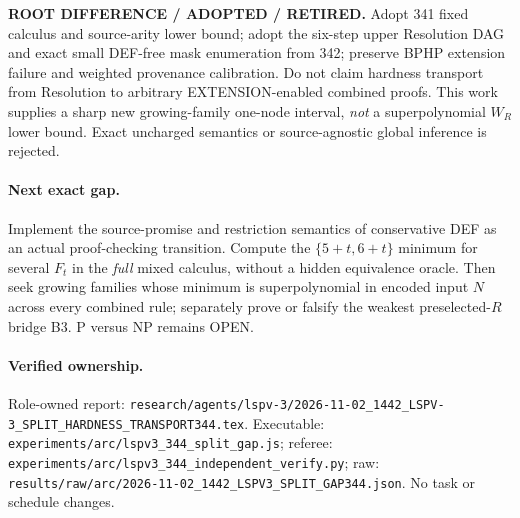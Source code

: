 \documentclass[11pt]{article}
\begin{document}
\textbf{ROOT DIFFERENCE / ADOPTED / RETIRED.} Adopt 341 fixed calculus and source-arity lower bound; adopt the six-step upper Resolution DAG and exact small DEF-free mask enumeration from 342; preserve BPHP extension failure and weighted provenance calibration. Do not claim hardness transport from Resolution to arbitrary EXTENSION-enabled combined proofs. This work supplies a sharp new growing-family one-node interval, \emph{not} a superpolynomial $W_R$ lower bound. Exact uncharged semantics or source-agnostic global inference is rejected.

\paragraph{Next exact gap.}
Implement the source-promise and restriction semantics of conservative DEF as an actual proof-checking transition. Compute the $\{5+t,6+t\}$ minimum for several $F_t$ in the \emph{full} mixed calculus, without a hidden equivalence oracle. Then seek growing families whose minimum is superpolynomial in encoded input $N$ across every combined rule; separately prove or falsify the weakest preselected-$R$ bridge B3. P versus NP remains OPEN.

\paragraph{Verified ownership.}
Role-owned report: \texttt{research/agents/lspv-3/2026-11-02\_1442\_LSPV-3\_SPLIT\_HARDNESS\_TRANSPORT344.tex}. Executable: \texttt{experiments/arc/lspv3\_344\_split\_gap.js}; referee: \texttt{experiments/arc/lspv3\_344\_independent\_verify.py}; raw: \texttt{results/raw/arc/2026-11-02\_1442\_LSPV3\_SPLIT\_GAP344.json}. No task or schedule changes.



\end{document}
